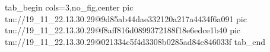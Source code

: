  
 
 
 
 

\qqSecOrig


\ifcmt
  tab_begin cols=3,no_fig,center
    pic tm://19_11_22.13.30.29@9d85ab44dae332120a217a4434f6a091
    pic tm://19_11_22.13.30.29@f8aff816d0899372188f18e6edce1b40
    pic tm://19_11_22.13.30.29@021334c5f4d3308b0285ad84e846033f
  tab_end
\fi

